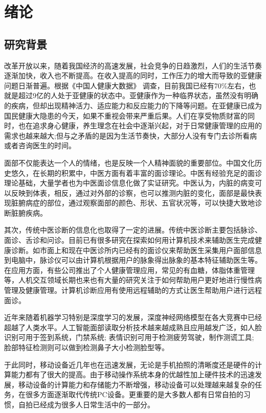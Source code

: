 \chapter{绪论}

\section{研究背景}
改革开放以来，随着我国经济的高速发展，社会竞争的日趋激烈，人们的生活节奏逐渐加快，收入也不断提高。在收入提高的同时，工作压力的增大而导致的亚健康问题日渐普遍。根据《中国人健康大数据》\cite{中国人健康大数据} 调查，目前我国已经有70\%左右，也就是超过9亿的人处于亚健康的状态中。亚健康作为一种临界状态，虽然没有明确的疾病，但却出现精神活力、适应能力和反应能力的下降等问题。在亚健康已成为国民健康大隐患的今天，如果不重视会带来严重后果。人们在享受物质财富的同时，也在追求身心健康，养生理念在社会中逐渐兴起，对于日常健康管理的应用的需求也越来越大;但与之矛盾的是因为生活节奏快，大部分人没有专门去诊所看病或者咨询医生的时间。

面部不仅能表达一个人的情绪，也是反映一个人精神面貌的重要部位。中国文化历史悠久，在长期的积累中，中医方面有着丰富的面诊理论。中医有经验充足的面诊理论基础，大量学者也为中医面诊信息化做了实证研究。中医认为，内脏的病变可以反映到体表，相反，通过对外部的诊察，也可以推测内脏的变化，面部是最快表现脏腑病症的部位，通过观察面部的颜色、形状、五官状况等，可以快捷大致地诊断脏腑疾病。

其次，传统中医诊断的信息化也取得了一定的进展。传统中医诊断主要包括脉诊、面诊、舌诊和问诊。目前已有很多研究在探索如何用计算机技术来辅助医生完成健康诊断。如市面上和现在中医诊所内已经有的面诊仪来帮助医生采集用户面部信息到电脑中，脉诊仪可以由计算机根据用户的脉象得出脉象的基本特征辅助医生等\cite{Zhang2018Study2}。在应用方面，有些公司推出了个人健康管理应用，常见的有血糖，体脂体重管理等，人机交互领域长期也来也有大量的研究关注于如何帮助用户更好地进行慢性病管理及健康管理。计算机诊断应用有使用远程辅助的方式让医生帮助用户进行远程面诊。

近年来随着机器学习特别是深度学习的发展，深度神经网络模型在各大竞赛中已经超越了人类水平。人工智能面部读取分析技术越来越成熟且应用越发广泛，如人脸识别可用于签到系统，门禁系统; 表情识别可用于检测疲劳驾驶，制作测谎工具; 脸部特征检测则可以做到检测鼻子大小检测脸型等。

于此同时，移动设备近几年也在迅速发展，无论是手机拍照的清晰度还是硬件的计算能力都有了很大的提高。由于移动操作系统本身的优越性加上硬件技术的迅速发展，移动设备的计算能力和存储能力不断增强，移动设备可以处理越来越复杂的任务，在很多方面逐渐取代传统PC设备。更重要的是大多数人都有日常自拍的习惯，自拍已经成为很多人日常生活中的一部分。

